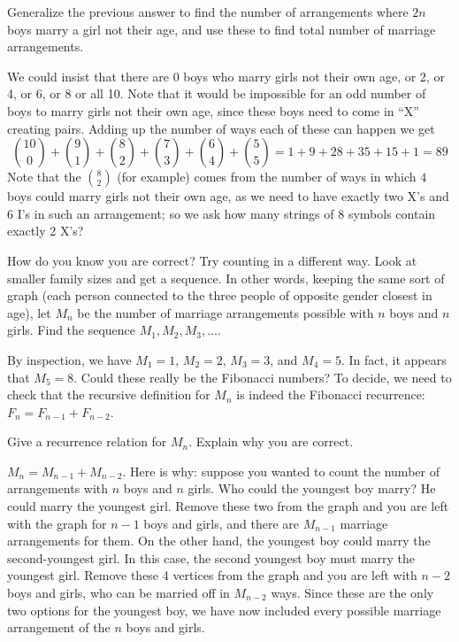 \documentclass[11pt]{exam}
\begin{document}
\begin{questions}
\vfill

\question Generalize the previous answer to find the number of arrangements where $2n$ boys marry a girl not their age, and use these to find total number of marriage arrangements.

\begin{solution}
We could insist that there are 0 boys who marry girls not their own age, or 2, or 4, or 6, or 8 or all 10.  Note that it would be impossible for an odd number of boys to marry girls not their own age, since these boys need to come in ``X'' creating pairs.  Adding up the number of ways each of these can happen we get
\[{10 \choose 0} + {9 \choose 1} + {8 \choose 2} + {7 \choose 3} + {6 \choose 4} + {5 \choose 5} = 1 + 9 + 28 + 35 + 15 + 1 = 89\]
Note that the ${8 \choose 2}$ (for example) comes from the number of ways in which $4$ boys could marry girls not their own age, as we need to have exactly two X's and 6 I's in such an arrangement; so we ask how many strings of 8 symbols contain exactly 2 X's?
\end{solution}



\vfill


\question How do you know you are correct?  Try counting in a different way.  Look at smaller family sizes and get a sequence.  In other words, keeping the same sort of graph (each person connected to the three people of opposite gender closest in age), let $M_n$ be the number of marriage arrangements possible with $n$ boys and $n$ girls.  Find the sequence $M_1, M_2, M_3,\ldots$.

\begin{solution}
By inspection, we have $M_1 = 1$, $M_2 = 2$, $M_3 = 3$, and $M_4 = 5$.  In fact, it appears that $M_5 = 8$.  Could these really be the Fibonacci numbers?  To decide, we need to check that the recursive definition for $M_n$ is indeed the Fibonacci recurrence: $F_n = F_{n-1} + F_{n-2}$.

\end{solution}

\vfill

\question Give a recurrence relation for $M_n$.  Explain why you are correct.

\begin{solution}
$M_n = M_{n-1} + M_{n-2}$.  Here is why: suppose you wanted to count the number of arrangements with $n$ boys and $n$ girls.  Who could the youngest boy marry?  He could marry the youngest girl.  Remove these two from the graph and you are left with the graph for $n-1$ boys and girls, and there are $M_{n-1}$ marriage arrangements for them.  On the other hand, the youngest boy could marry the second-youngest girl.  In this case, the second youngest boy must marry the youngest girl.  Remove these 4 vertices from the graph and you are left with $n-2$ boys and girls, who can be married off in $M_{n-2}$ ways.  Since these are the only two options for the youngest boy, we have now included every possible marriage arrangement of the $n$ boys and girls.
\end{solution}



\vfill




\end{questions}
\end{document}
